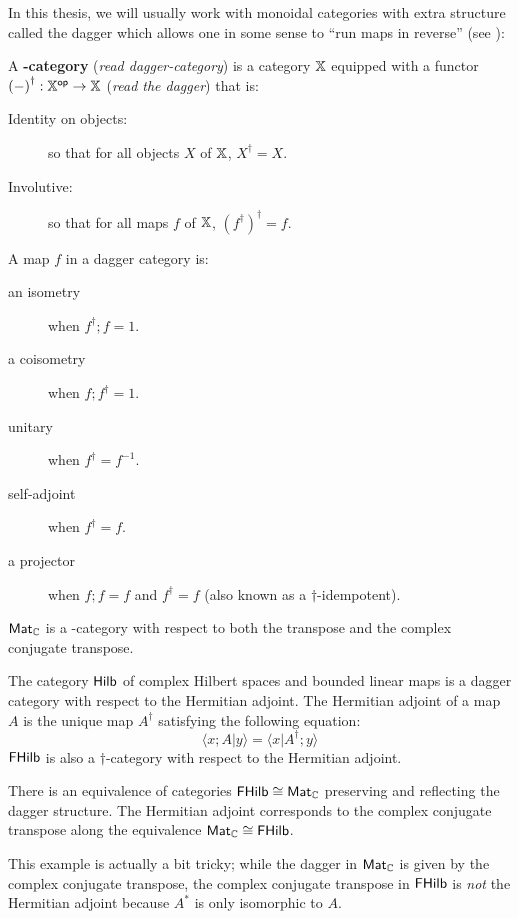 In this thesis, we will usually work with monoidal categories with extra structure called the dagger which allows one in some sense to ``run maps in reverse''  (see \cite{cpm,abramsky}):
\begin{definition}
A {\bf \dag-category} ({\em read dagger-category}) is a category $\mathbb{X}$ equipped with a functor ${(-)}^\dag:\mathbb{X}^{\mathsf{op}}\to\mathbb{X}$ ({\em read the dagger}) that is:
\begin{description}
\item[Identity on objects:] so that for all objects $X$ of $\mathbb{X}$, $X^\dag = X$.
\item[Involutive:] so that for all maps $f$ of $\mathbb{X}$, $(f^\dag)^\dag = f$.
\end{description}
A map $f$ in a dagger category is:
\begin{description}
\item[an isometry] when $f^\dag; f = 1$.
\item[a coisometry] when $f; f^\dag = 1$.
\item[unitary] when $f^\dag = f^{-1}$.
\item[self-adjoint] when $f^\dag=f$.
\item[a projector]  when $f;f=f$ and $f^\dag=f$ (also known as a $\dag$-idempotent).
\end{description}
\end{definition}
\begin{example}
 $\mathsf{Mat}_{\mathbb{C}}$ is a \dag-category with respect to both the transpose and the complex conjugate transpose.
\end{example}
\begin{example}
The category $\mathsf{Hilb}$ of complex Hilbert spaces and bounded linear maps is a dagger category with respect to the Hermitian adjoint.  The Hermitian adjoint of a map $A$ is the unique map $A^\dag$ satisfying the following equation:
$$
\langle x;A|y\rangle = \langle x | A^\dag; y \rangle
$$
$\mathsf{FHilb}$  is also a $\dag$-category with respect to the Hermitian adjoint.
\end{example}
\begin{lemma}
There is an equivalence of categories $\mathsf{FHilb} \cong \mathsf{Mat}_{\mathbb{C}}$ preserving and reflecting the dagger structure.
The Hermitian adjoint corresponds to the complex conjugate transpose along the equivalence $\mathsf{Mat}_{\mathbb{C}} \cong \mathsf{FHilb}$.
\end{lemma}
This example is actually a bit tricky; while the dagger in $\mathsf{Mat}_{\mathbb{C}}$ is given by the complex conjugate transpose, the complex conjugate transpose in $\mathsf{FHilb}$ is {\em not} the Hermitian adjoint because $A^*$ is only isomorphic to $A$.




